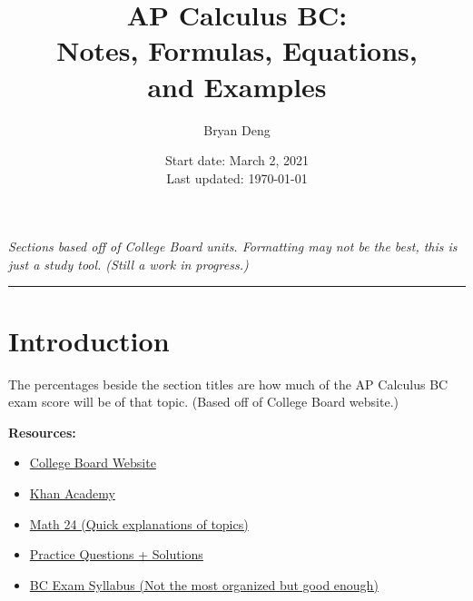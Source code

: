 \documentclass[12pt]{article}
\title{\textbf{AP Calculus BC:\\Notes, Formulas,  Equations,\\and Examples}}
\author{Bryan Deng}
\date{Start date: March 2, 2021\\Last updated: \today}
\begin{document}
    \maketitle
    \vfill
    \begin{center}
        \textit{Sections based off of College Board units.
        \newline
        Formatting may not be the best, this is just a study tool. (Still a work in progress.)}
    \end{center}
    \newpage

    \tableofcontents
    \par\noindent\rule{\textwidth}{0.4pt} %
    \newpage

    \section*{Introduction}
        \indent The percentages beside the section titles are how much of the AP Calculus BC exam score will be of that topic. (Based off of College Board website.)

        \noindent \textbf{Resources:}
        \begin{itemize}
            \item \href{https://apstudents.collegeboard.org/courses/ap-calculus-bc}{College Board Website}
            \item \href{https://www.khanacademy.org/math/ap-calculus-bc}{Khan Academy}
            \item \href{https://www.math24.net/topics-calculus}{Math 24 (Quick explanations of topics)}
            \item \href{https://www.math.ucdavis.edu/~kouba/CalcOneDIRECTORY/}{Practice Questions + Solutions}
            \item \href{https://www.chelmsford.k12.ma.us/site/handlers/filedownload.ashx?moduleinstanceid=2496&dataid=7289&FileName=AP%20Calculus%20BC%20Syllabus.pdf}{BC Exam Syllabus (Not the most organized but good enough)}
        \end{itemize}
\end{document}
